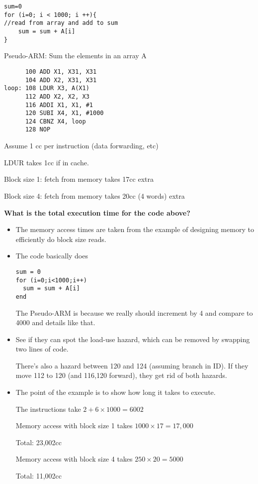 \begin{frame}[fragile]
\begin{tcolorbox}[enhanced,attach boxed title to top center={yshift=-3mm,yshifttext=-1mm},
  colback=red!5!white,colframe=red!75!black,colbacktitle=red!80!black,
  title=Try this,fonttitle=\bfseries,
  boxed title style={size=small,colframe=red!50!black} ]
{\footnotesize
\begin{multicols}{2}

    \begin{verbatim}
sum=0
for (i=0; i < 1000; i ++){
//read from array and add to sum
    sum = sum + A[i] 
}
\end{verbatim}


\columnbreak

Pseudo-ARM: Sum the elements in an array A
\begin{verbatim}
      100 ADD X1, X31, X31
      104 ADD X2, X31, X31
loop: 108 LDUR X3, A(X1)
      112 ADD X2, X2, X3
      116 ADDI X1, X1, #1
      120 SUBI X4, X1, #1000
      124 CBNZ X4, loop
      128 NOP
\end{verbatim}
\end{multicols}
  

Assume 1 cc per instruction (data forwarding, etc)

LDUR takes 1cc if in cache.

Block size 1: fetch from memory takes 17cc extra

Block size 4: fetch from memory takes 20cc (4 words) extra

\textbf{What is the total execution time for the code above?}
}
\end{tcolorbox}
\BNotes\ifnum{}
\begin{itemize}
\item The memory access times are taken from the example of
	designing memory to efficiently do block size reads.
\item The code basically does
\begin{verbatim}
sum = 0
for (i=0;i<1000;i++)
  sum = sum + A[i]
end
\end{verbatim}
The Pseudo-ARM is because we really should increment by 4 and compare to 4000
and details like that.
\item See if they can spot the load-use hazard, which can be removed by
	swapping two lines of code. 

	There's also a hazard between 120 and
		124 (assuming branch in ID).  If they move 112 to 120 
		(and 116,120 forward), they get rid of both hazards.
  \item The point of the example is to show how long it takes to
    execute.  

    The instructions take $2+6\times1000=6002$

    Memory access with block size 1 takes $1000\times17=17,000$

    Total: 23,002cc

    Memory access with block size 4 takes $250\times20=5000$

    Total: 11,002cc
\end{itemize}
\fi\ENotes
\end{frame}

